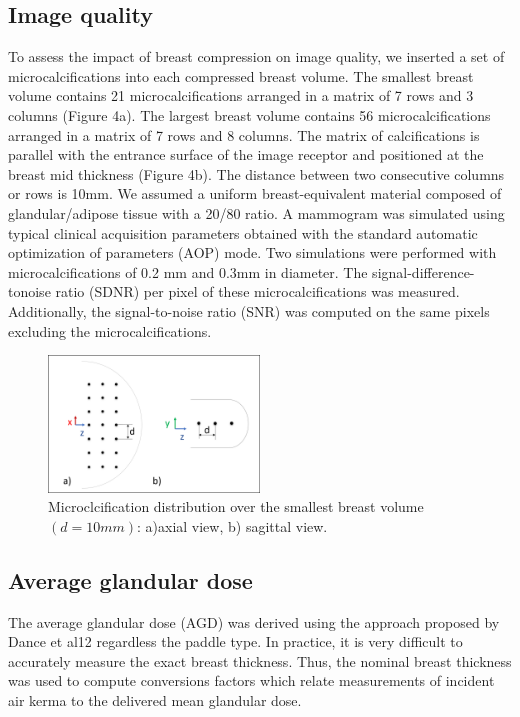 \subsection{Image quality }\label{section:averagegalndulardose}
To assess the impact of breast compression on image quality, we inserted a set of microcalcifications into each compressed breast volume. The smallest breast volume contains 21 microcalcifications arranged in a matrix of 7 rows and 3 columns (Figure 4a). The largest breast volume contains 56 microcalcifications arranged in a matrix of 7 rows and 8 columns. The matrix of calcifications is parallel with the entrance surface of the image receptor and positioned at the breast mid thickness (Figure 4b). The distance between two consecutive columns or rows is 10mm. We assumed a uniform breast-equivalent material composed of glandular/adipose tissue with a 20/80 ratio. A mammogram was simulated using typical clinical acquisition parameters obtained with the standard automatic optimization of parameters (AOP) mode. Two simulations were performed with microcalcifications of 0.2 mm and 0.3mm in diameter. The signal-difference-tonoise ratio (SDNR) per pixel of these microcalcifications was measured. Additionally, the signal-to-noise ratio (SNR) was computed on the same pixels excluding the microcalcifications.  


\begin{figure}[!h]
\centering
\includegraphics[width=0.5\textwidth,keepaspectratio]{figures/microcalcifications.png} 
\caption{Microclcification distribution over the smallest breast volume $(d=10mm)$: a)axial view, b) sagittal view.}\label{fig:compressionpaddles}
\end{figure}

\subsection{ Average glandular dose}
The average glandular dose (AGD) was derived using the approach proposed by Dance et al12 regardless the paddle type.  In practice, it is very difficult to accurately measure the exact breast thickness. Thus, the nominal breast thickness was used to compute conversions factors which relate measurements of incident air kerma to the delivered mean glandular dose.


